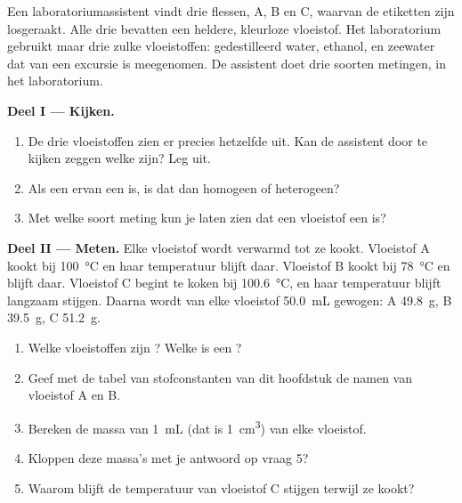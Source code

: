 \begin{problem}
\label{pb:g6:pure-substances-and-mixtures:1}
Een laboratoriumassistent vindt drie flessen, A, B en C, waarvan de
etiketten zijn losgeraakt. Alle drie bevatten een heldere, kleurloze
vloeistof. Het laboratorium gebruikt maar drie zulke vloeistoffen:
gedestilleerd water, ethanol, en zeewater dat van een excursie is
meegenomen. De assistent doet drie soorten metingen, in het
laboratorium.

\medskip
\noindent\textbf{Deel I --- Kijken.}
\begin{enumerate}
  \item De drie vloeistoffen zien er precies hetzelfde uit. Kan de
        assistent door te kijken zeggen welke  zijn? Leg
        uit.
  \item Als een ervan een  is, is dat dan homogeen of heterogeen?
  \item Met welke soort meting kun je laten zien dat een vloeistof een
         is?
\end{enumerate}

\medskip
\noindent\textbf{Deel II --- Meten.}
Elke vloeistof wordt verwarmd tot ze kookt. Vloeistof A kookt bij
\qty{100}{\celsius} en haar temperatuur blijft daar. Vloeistof B kookt bij
\qty{78}{\celsius} en blijft daar. Vloeistof C begint te koken bij
\qty{100.6}{\celsius}, en haar temperatuur blijft langzaam stijgen.
Daarna wordt van elke vloeistof \qty{50.0}{mL} gewogen: A \qty{49.8}{g}, B
\qty{39.5}{g}, C \qty{51.2}{g}.
\begin{enumerate}[resume]
  \item Welke vloeistoffen zijn ? Welke is een ?
  \item Geef met de tabel van stofconstanten van dit hoofdstuk de namen
        van vloeistof A en B.
  \item Bereken de massa van \qty{1}{mL} (dat is \qty{1}{cm^3}) van
        elke vloeistof.
  \item Kloppen deze massa's met je antwoord op vraag 5?
  \item Waarom blijft de temperatuur van vloeistof C stijgen terwijl ze
        kookt?
\end{enumerate}


\end{problem}
